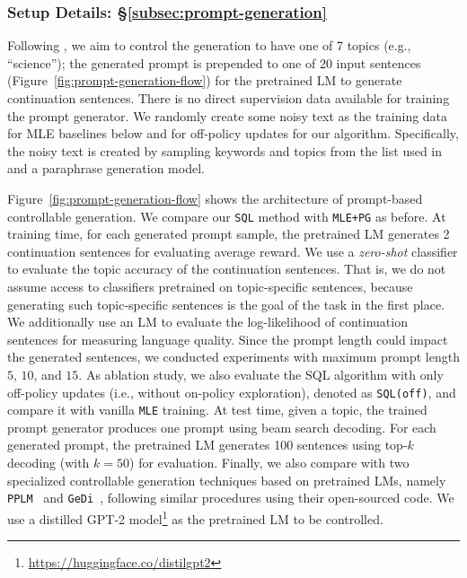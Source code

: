 \subsubsection{Setup Details: \S\ref{subsec:prompt-generation}}
\label{appendix-subsubsec:setup-prompt-generation}
Following \citep{dathathri2019plug}, we aim to control the generation to have one of 7 topics (e.g., ``science''); the generated prompt is prepended to one of 20 input sentences (Figure~\ref{fig:prompt-generation-flow}) for the pretrained LM to generate continuation sentences.
There is no direct supervision data available for training the prompt generator. We randomly create some noisy text as the training data for MLE baselines below and for off-policy updates for our algorithm. Specifically, the noisy text is created by sampling keywords and topics from the list used in \citep{Dathathri2020Plug} and a paraphrase generation model.

Figure~\ref{fig:prompt-generation-flow} shows the architecture of prompt-based controllable generation. We compare our \texttt{SQL} method with \texttt{MLE+PG} as before. At training time, for each generated prompt sample, the pretrained LM generates 2 continuation sentences for evaluating average reward. We use a \emph{zero-shot} classifier to evaluate the topic accuracy of the continuation sentences. That is, we do not assume access to classifiers pretrained on topic-specific sentences, because generating such topic-specific sentences is the goal of the task in the first place. We additionally use an LM to evaluate the log-likelihood of continuation sentences for measuring language quality. Since the prompt length could impact the generated sentences, we conducted experiments with maximum prompt length $5$, $10$, and $15$. As ablation study, we also evaluate the SQL algorithm with only off-policy updates (i.e., without on-policy exploration), denoted as \texttt{SQL(off)}, and compare it with vanilla \texttt{MLE} training. At test time, given a topic, the trained prompt generator produces one prompt using beam search decoding. For each generated prompt, the pretrained LM generates 100 sentences using top-$k$ decoding (with $k=50$) for evaluation. Finally, we also compare with two specialized controllable generation techniques based on pretrained LMs, namely \texttt{PPLM}~\citep{dathathri2019plug} and \texttt{GeDi}~\citep{krause2020gedi}, following similar procedures using their open-sourced code. We use a distilled GPT-2 model\footnote{\url{https://huggingface.co/distilgpt2}} as the pretrained LM to be controlled.
